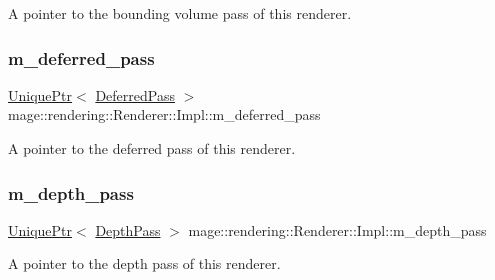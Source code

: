 A pointer to the bounding volume pass of this renderer. \hypertarget{classmage_1_1rendering_1_1_renderer_1_1_impl_acab2b5fe9403dd1a7643ae91e8a0433d}{}\label{classmage_1_1rendering_1_1_renderer_1_1_impl_acab2b5fe9403dd1a7643ae91e8a0433d} 
\subsubsection{\texorpdfstring{m\+\_\+deferred\+\_\+pass}{m\_deferred\_pass}}
{\footnotesize\ttfamily \hyperlink{namespacemage_a3316d7143a973e37adf1110f2e80ca31}{Unique\+Ptr}$<$ \hyperlink{classmage_1_1rendering_1_1_deferred_pass}{Deferred\+Pass} $>$ mage\+::rendering\+::\+Renderer\+::\+Impl\+::m\+\_\+deferred\+\_\+pass\hspace{0.3cm}{\ttfamily [private]}}

A pointer to the deferred pass of this renderer. \hypertarget{classmage_1_1rendering_1_1_renderer_1_1_impl_a6774962f06bc28a23ac7e34d8891bb24}{}\label{classmage_1_1rendering_1_1_renderer_1_1_impl_a6774962f06bc28a23ac7e34d8891bb24} 
\subsubsection{\texorpdfstring{m\+\_\+depth\+\_\+pass}{m\_depth\_pass}}
{\footnotesize\ttfamily \hyperlink{namespacemage_a3316d7143a973e37adf1110f2e80ca31}{Unique\+Ptr}$<$ \hyperlink{classmage_1_1rendering_1_1_depth_pass}{Depth\+Pass} $>$ mage\+::rendering\+::\+Renderer\+::\+Impl\+::m\+\_\+depth\+\_\+pass\hspace{0.3cm}{\ttfamily [private]}}

A pointer to the depth pass of this renderer. \hypertarget{classmage_1_1rendering_1_1_renderer_1_1_impl_acbd7937a78edf6a8c3f24fc0a300216b}{}\label{classmage_1_1rendering_1_1_renderer_1_1_impl_acbd7937a78edf6a8c3f24fc0a300216b} 
